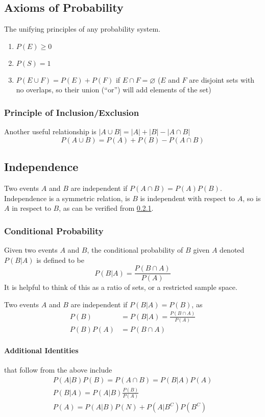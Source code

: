 \documentclass{article}
\begin{document}
\subsection{Axioms of Probability}\label{prob-ax}
The unifying principles of any probability system.

\begin{enumerate}
    \item $P(E)\ge0$
    \item $P(S)=1$
    \item $P(E \cup F) = P(E) + P(F)$ if $E \cap F = \varnothing$ ($E$ and $F$ are disjoint sets with no overlaps, so their union (``or'') will add elements of the set)
\end{enumerate}

\subsubsection{Principle of Inclusion/Exclusion}
Another useful relationship is
$|A \cup B| = |A| + |B| - |A \cap B|$
$$P(A \cup B) = P(A) + P(B) - P(A \cap B)$$

\subsection{Independence}
Two events $A$ and $B$ are independent if $P(A \cap B) = P(A)P(B)$.
Independence is a symmetric relation, is $B$ is independent with respect to $A$, so is $A$ in respect to $B$, as can be verified from \ref{cond-prob}.

\subsubsection{Conditional Probability}\label{cond-prob}
Given two events $A$ and $B$, the conditional probability of $B$ given $A$ denoted $P(B|A)$ is defined to be 
$$P(B|A)=\frac{P(B \cap A)}{P(A)}$$
It is helpful to think of this as a ratio of sets, or a restricted sample space.

Two events $A$ and $B$ are independent if $P(B|A)=P(B)$, as
\begin{align*}
    P(B) &= P(B|A) = \frac{P(B \cap A)}{P(A)}\\
    P(B)P(A) &= P(B \cap A)
\end{align*}

\paragraph{Additional Identities} that follow from the above include
\begin{align*}
    P(A|B)P(B) = P(A \cap B) = P(B|A)P(A)\\
    P(B|A) = P(A|B)\frac{P(B)}{P(A)}\\
    P(A) = P(A|B)P(N)+P(A|B^C)P(B^C)
\end{align*}
\end{document}
